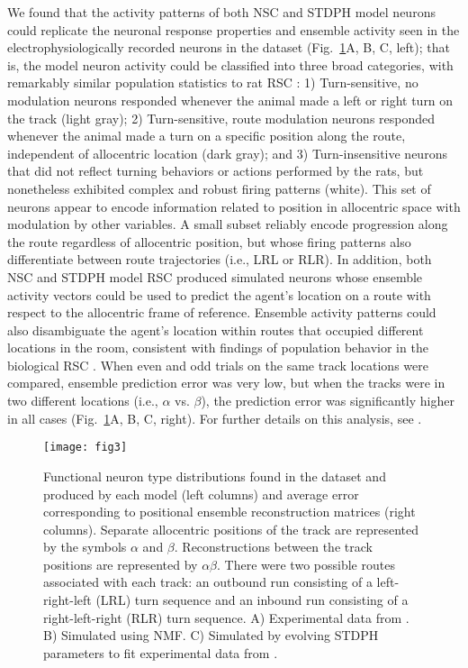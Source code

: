 We found that the activity patterns of both \ac{NSC} and \ac{STDPH} model neurons could replicate the neuronal response properties and ensemble activity seen in the electrophysiologically recorded neurons in the dataset (Fig.~\ref{fig:NMF|RSC}A, B, C, left); that is, the model neuron activity could be classified into three broad categories,
with remarkably similar population statistics to rat \ac{RSC} 
\citep{AlexanderNitz2015}:
1) Turn-sensitive, no modulation neurons responded whenever the animal made a left or right turn
   on the track (light gray);
2) Turn-sensitive, route modulation neurons responded whenever the animal made a turn on a specific position along
   the route, independent of allocentric location (dark gray); and
3) Turn-insensitive neurons that did not reflect turning behaviors or actions performed by the rats,
   but nonetheless exhibited complex and robust firing patterns (white). This set of neurons appear to encode information related to position in allocentric space with modulation by other variables. A small subset reliably encode progression along the route regardless of allocentric position, but whose firing patterns also differentiate between route trajectories (i.e., LRL or RLR). In addition, both \ac{NSC} and \ac{STDPH} model \ac{RSC} produced simulated neurons whose ensemble activity vectors could be used to predict the agent's location on a route with respect to the allocentric frame of reference. Ensemble activity patterns could also disambiguate the agent's location within routes that occupied different locations in the room, consistent with findings of population behavior in the biological RSC \citep{AlexanderNitz2015}.
When even and odd trials on the same track locations were compared,
ensemble prediction error was very low,
but when the tracks were in two different locations
(i.e., $\alpha$ vs. $\beta$),
the prediction error was significantly higher in all cases
(Fig.~\ref{fig:NMF|RSC}A, B, C, right).
For further details on this analysis, see \citep{AlexanderNitz2015,Rounds2016}.
   
\begin{figure}[ht]
	\centering
	\texttt{[image: fig3]}
    \caption{Functional neuron type distributions found in the dataset and produced by each model (left columns) and average error corresponding to positional ensemble reconstruction matrices (right columns). Separate allocentric positions of the track are represented by the symbols $\alpha$ and $\beta$. Reconstructions between the track positions are represented by $\alpha$$\beta$. There were two possible routes associated with each track: an outbound run consisting of a left-right-left (LRL) turn sequence and an inbound run consisting of a right-left-right (RLR) turn sequence. A) Experimental data from \cite{AlexanderNitz2015}. B) Simulated using NMF. C) Simulated by evolving STDPH parameters to fit experimental data from \cite{Rounds2016}.}
	\label{fig:NMF|RSC}
\end{figure} 



